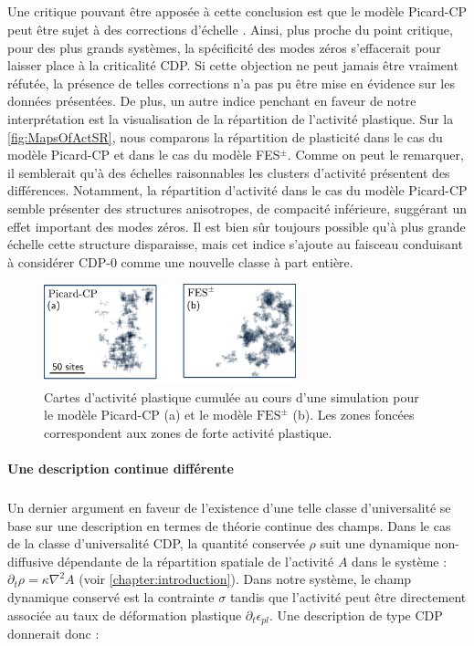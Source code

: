 \subparagraph{}Une critique pouvant être apposée à cette conclusion est que le modèle Picard-CP peut être sujet à des corrections d'échelle \cite{nishimori_elements_2015}. Ainsi, plus proche du point critique, pour des plus grands systèmes, la spécificité des modes zéros s'effacerait pour laisser place à la criticalité CDP. Si cette objection ne peut jamais être vraiment réfutée, la présence de telles corrections n'a pas pu être mise en évidence sur les données présentées. De plus, un autre indice penchant en faveur de notre interprétation est la visualisation de la répartition de l'activité plastique. Sur la \autoref{fig:MapsOfActSR}, nous comparons la répartition de plasticité dans le cas du modèle Picard-CP et dans le cas du modèle FES$^\pm$. Comme on peut le remarquer, il semblerait qu'à des échelles raisonnables les clusters d'activité présentent des différences. Notamment, la répartition d'activité dans le cas du modèle Picard-CP semble présenter des structures anisotropes, de compacité inférieure, suggérant un effet important des modes zéros. Il est bien sûr toujours possible qu'à plus grande échelle cette structure disparaisse, mais cet indice s'ajoute au faisceau conduisant à considérer CDP-0 comme une nouvelle classe à part entière.

\begin{figure}[h]
	\centering
	\includegraphics[width=0.65\textwidth]{Chapitre4/Figures/CourtePortee/MapsofActSR.pdf}
	\caption{Cartes d'activité plastique cumulée au cours d'une simulation pour le modèle Picard-CP (a) et le modèle $\text{FES}^\pm$ (b). Les zones foncées correspondent aux zones de forte activité plastique.}
	 \label{fig:MapsOfActSR}
\end{figure}

\paragraph{Une description continue différente}

\subparagraph{}Un dernier argument en faveur de l'existence d'une telle classe d'universalité se base sur une description en termes de théorie continue des champs. Dans le cas de la classe d'universalité CDP, la quantité conservée $\rho$ suit une dynamique non-diffusive dépendante de la répartition spatiale de l'activité $A$ dans le système : $\partial_t \rho = \kappa\nabla^2 A$ (voir \autoref{chapter:introduction}). Dans notre système, le champ dynamique conservé est la contrainte $\sigma$ tandis que l'activité peut être directement associée au taux de déformation plastique $\partial_t \epsilon_{pl}$. Une description de type CDP donnerait donc :

